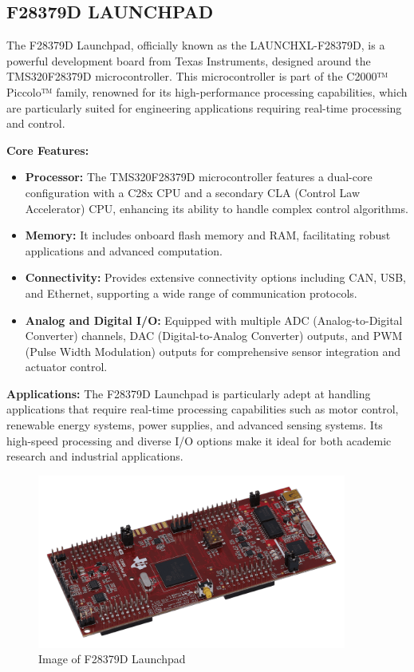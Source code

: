 \subsection{F28379D LAUNCHPAD}

The F28379D Launchpad, officially known as the LAUNCHXL-F28379D, is a powerful development board from Texas Instruments, designed around the TMS320F28379D microcontroller. This microcontroller is part of the C2000™ Piccolo™ family, renowned for its high-performance processing capabilities, which are particularly suited for engineering applications requiring real-time processing and control.

\textbf{Core Features:}
\begin{itemize}
    \item \textbf{Processor:} The TMS320F28379D microcontroller features a dual-core configuration with a C28x CPU and a secondary CLA (Control Law Accelerator) CPU, enhancing its ability to handle complex control algorithms.
    \item \textbf{Memory:} It includes onboard flash memory and RAM, facilitating robust applications and advanced computation.
    \item \textbf{Connectivity:} Provides extensive connectivity options including CAN, USB, and Ethernet, supporting a wide range of communication protocols.
    \item \textbf{Analog and Digital I/O:} Equipped with multiple ADC (Analog-to-Digital Converter) channels, DAC (Digital-to-Analog Converter) outputs, and PWM (Pulse Width Modulation) outputs for comprehensive sensor integration and actuator control.
\end{itemize}

\textbf{Applications:}
The F28379D Launchpad is particularly adept at handling applications that require real-time processing capabilities such as motor control, renewable energy systems, power supplies, and advanced sensing systems. Its high-speed processing and diverse I/O options make it ideal for both academic research and industrial applications.

\begin{figure}[H]
    \centering
    \includegraphics[width=4in]{sections/section4/images/f23879d/launchxl-f28379d-angled.png}
    \caption{Image of F28379D Launchpad}
\end{figure}

